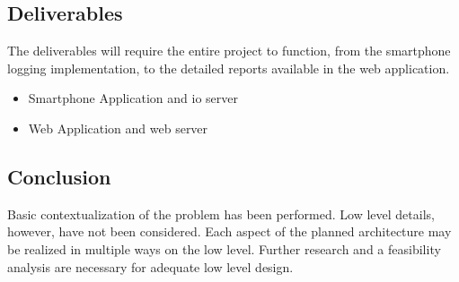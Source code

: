 \subsection{Deliverables}
The deliverables will require the entire project to function, from the smartphone logging implementation, to the detailed reports available in the web application. 
\begin{itemize}
\item Smartphone Application and \ac{io} server
\item Web Application and web server
\end{itemize}

\subsection{Conclusion}
Basic contextualization of the problem has been performed.
Low level details, however, have not been considered.
Each aspect of the planned architecture may be realized in multiple ways on the low level.
Further research and a feasibility analysis are necessary for adequate low level design.

\pagebreak
